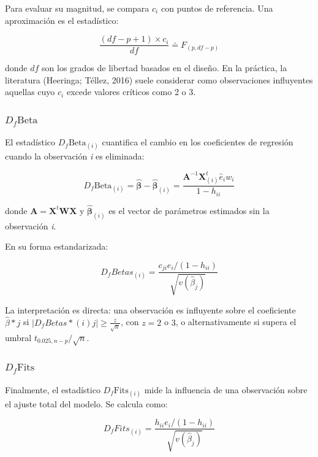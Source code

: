 \documentclass[
  12pt,
]{book}
\begin{document}
Para evaluar su magnitud, se compara \(c_i\) con puntos de referencia. Una aproximación es el estadístico:

\[
\frac{\left(df-p+1\right)\times c_{i}}{df} \doteq F_{\left(p,df-p\right)}
\]

donde \(df\) son los grados de libertad basados en el diseño. En la práctica, la literatura (Heeringa; Téllez, 2016) suele considerar como observaciones influyentes aquellas cuyo \(c_i\) excede valores críticos como 2 o 3.

\subsubsection{\texorpdfstring{\(D_f\text{Beta}\)}{D\_f\textbackslash text\{Beta\}}}\label{d_ftextbeta}

El estadístico \textbf{\(D_f \text{Beta}_{(i)}\)} cuantifica el cambio en los coeficientes de regresión cuando la observación \emph{i} es eliminada:

\[
D_f \text{Beta}_{(i)} = \hat{\boldsymbol{\beta}}-\hat{\boldsymbol{\beta}}_{\left(i\right)}=\frac{\boldsymbol{A}^{-1}\boldsymbol{X}_{\left(i\right)}^{t}\hat{e}_{i}w_{i}}{1-h_{ii}}
\]

donde \(\boldsymbol{A} =\boldsymbol{X}^{t}\boldsymbol{WX}\) y \(\hat{\boldsymbol{\beta}}_{(i)}\) es el vector de parámetros estimados sin la observación \emph{i}.

En su forma estandarizada:

\[
D_f Betas_{\left(i\right)}=\frac{{c_{ji}e_{i}}\big/{\left(1-h_{ii}\right)}}{\sqrt{v\left(\hat{\beta}_{j}\right)}}
\]

La interpretación es directa: una observación es influyente sobre el coeficiente \(\hat{\beta}*j\) si \(|D_f Betas*{(i)j}|\geq \frac{z}{\sqrt{n}}\), con \(z=2\) o \(3\), o alternativamente si supera el umbral \(t_{0.025,n-p}/\sqrt{n}\).

\subsubsection{\texorpdfstring{\(D_f \text{Fits}\)}{D\_f \textbackslash text\{Fits\}}}\label{d_f-textfits}

Finalmente, el estadístico \textbf{\(D_f \text{Fits}_{(i)}\)} mide la influencia de una observación sobre el ajuste total del modelo. Se calcula como:

\[
D_{f}Fits_{\left(i\right)}= \frac{h_{ii}e_{i}\big/\left(1-h_{ii}\right)}{\sqrt{v\left(\hat{\beta}_{j}\right)}}
\]
\end{document}
